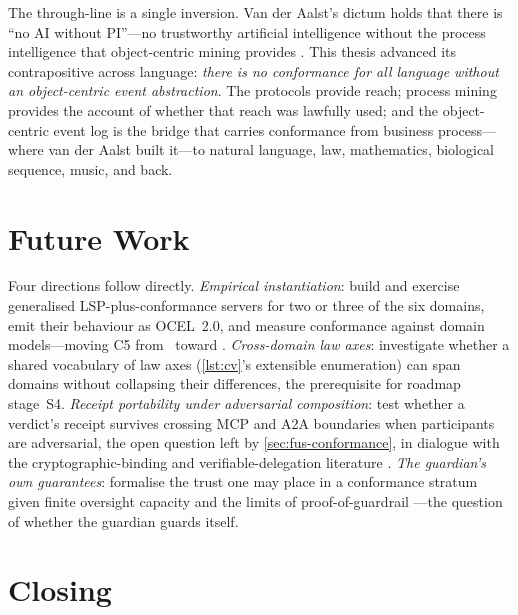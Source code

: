 The through-line is a single inversion. Van der Aalst's dictum holds that there is
``no AI without PI''---no trustworthy artificial intelligence without the process
intelligence that object-centric mining provides \citep{noai-nopi-2025}. This
thesis advanced its contrapositive across language: \emph{there is no conformance
for all language without an object-centric event abstraction}. The protocols
provide reach; process mining provides the account of whether that reach was
lawfully used; and the object-centric event log is the bridge that carries
conformance from business process---where van der Aalst built it---to natural
language, law, mathematics, biological sequence, music, and back.

\section{Future Work}
\label{sec:conc-future}

Four directions follow directly. \emph{Empirical instantiation}: build and exercise
generalised LSP-plus-conformance servers for two or three of the six domains, emit
their behaviour as OCEL~2.0, and measure conformance against domain models---moving
C5 from \candidate\ toward \admitted. \emph{Cross-domain law axes}: investigate
whether a shared vocabulary of law axes (\cref{lst:cv}'s extensible enumeration)
can span domains without collapsing their differences, the prerequisite for
roadmap stage~S4. \emph{Receipt portability under adversarial composition}: test
whether a verdict's receipt survives crossing MCP and A2A boundaries when
participants are adversarial, the open question left by \cref{sec:fus-conformance},
in dialogue with the cryptographic-binding and verifiable-delegation literature
\citep{zhou26gov,prakash26aip}. \emph{The guardian's own guarantees}: formalise the
trust one may place in a conformance stratum given finite oversight capacity
\citep{turan26} and the limits of proof-of-guardrail \citep{jin26guardrail}---the
question of whether the guardian guards itself.

\section{Closing}
\label{sec:conc-closing}

